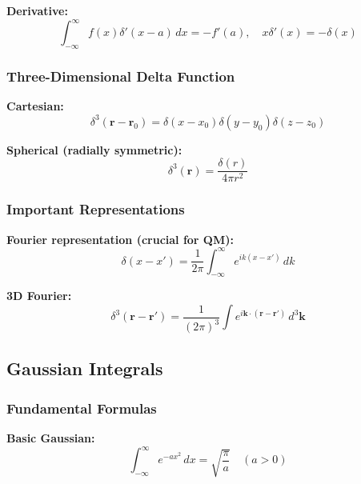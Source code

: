 \documentclass[11pt,a4paper]{article}
\begin{document}
\textbf{Derivative:}
\begin{equation}
\int_{-\infty}^{\infty} f(x)\delta'(x - a)\, dx = -f'(a), \quad x\delta'(x) = -\delta(x)
\tag{D.7}
\end{equation}

\subsubsection{Three-Dimensional Delta Function}

\textbf{Cartesian:}
\begin{equation}
\boxed{\delta^3(\mathbf{r} - \mathbf{r}_0) = \delta(x - x_0)\delta(y - y_0)\delta(z - z_0)}
\tag{D.8}
\end{equation}

\textbf{Spherical (radially symmetric):}
\begin{equation}
\delta^3(\mathbf{r}) = \frac{\delta(r)}{4\pi r^2}
\tag{D.9}
\end{equation}

\subsubsection{Important Representations}

\textbf{Fourier representation (crucial for QM):}
\begin{equation}
\boxed{\delta(x - x') = \frac{1}{2\pi}\int_{-\infty}^{\infty} e^{ik(x - x')}\, dk}
\tag{D.10}
\end{equation}

\textbf{3D Fourier:}
\begin{equation}
\delta^3(\mathbf{r} - \mathbf{r}') = \frac{1}{(2\pi)^3}\int e^{i\mathbf{k}\cdot(\mathbf{r} - \mathbf{r}')}\, d^3\mathbf{k}
\tag{D.11}
\end{equation}

\subsection{Gaussian Integrals}

\subsubsection{Fundamental Formulas}

\textbf{Basic Gaussian:}
\begin{equation}
\boxed{\int_{-\infty}^{\infty} e^{-ax^2}\, dx = \sqrt{\frac{\pi}{a}} \quad (a > 0)}
\tag{G.1}
\end{equation}
\end{document}
